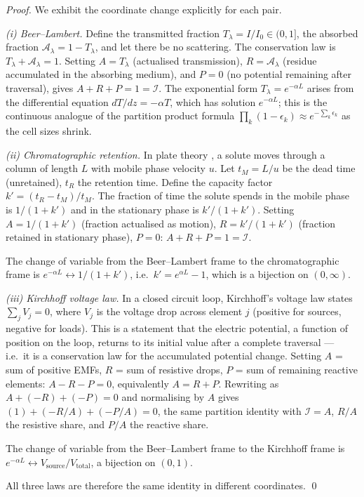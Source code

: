 \documentclass[11pt,twocolumn,a4paper]{article}
\theoremstyle{plain}
\theoremstyle{definition}
\theoremstyle{remark}
\begin{document}
\begin{proof}
We exhibit the coordinate change explicitly for each pair.

\medskip
\noindent\textit{(i) Beer--Lambert.} Define the transmitted fraction $T_\lambda=I/I_0\in(0,1]$, the absorbed fraction $\mathcal{A}_\lambda=1-T_\lambda$, and let there be no scattering. The conservation law is $T_\lambda+\mathcal{A}_\lambda=1$. Setting $A=T_\lambda$ (actualised transmission), $R=\mathcal{A}_\lambda$ (residue accumulated in the absorbing medium), and $P=0$ (no potential remaining after traversal), gives $A+R+P=1=\mathcal{I}$. The exponential form $T_\lambda=e^{-\alpha L}$ arises from the differential equation $dT/dz=-\alpha T$, which has solution $e^{-\alpha L}$; this is the continuous analogue of the partition product formula $\prod_k(1-\epsilon_k)\approx e^{-\sum_k\epsilon_k}$ as the cell sizes shrink.

\medskip
\noindent\textit{(ii) Chromatographic retention.} In plate theory \cite{Skoog2007}, a solute moves through a column of length $L$ with mobile phase velocity $u$. Let $t_M=L/u$ be the dead time (unretained), $t_R$ the retention time. Define the capacity factor $k'=(t_R-t_M)/t_M$. The fraction of time the solute spends in the mobile phase is $1/(1+k')$ and in the stationary phase is $k'/(1+k')$. Setting $A=1/(1+k')$ (fraction actualised as motion), $R=k'/(1+k')$ (fraction retained in stationary phase), $P=0$: $A+R+P=1=\mathcal{I}$.

The change of variable from the Beer--Lambert frame to the chromatographic frame is $e^{-\alpha L}\leftrightarrow 1/(1+k')$, i.e.\ $k'=e^{\alpha L}-1$, which is a bijection on $(0,\infty)$.

\medskip
\noindent\textit{(iii) Kirchhoff voltage law.} In a closed circuit loop, Kirchhoff's voltage law states $\sum_j V_j=0$, where $V_j$ is the voltage drop across element $j$ (positive for sources, negative for loads). This is a statement that the electric potential, a function of position on the loop, returns to its initial value after a complete traversal — i.e.\ it is a conservation law for the accumulated potential change. Setting $A$ = sum of positive EMFs, $R$ = sum of resistive drops, $P$ = sum of remaining reactive elements: $A-R-P=0$, equivalently $A=R+P$. Rewriting as $A+(-R)+(-P)=0$ and normalising by $A$ gives $(1)+(-R/A)+(-P/A)=0$, the same partition identity with $\mathcal{I}=A$, $R/A$ the resistive share, and $P/A$ the reactive share.

The change of variable from the Beer--Lambert frame to the Kirchhoff frame is $e^{-\alpha L}\leftrightarrow V_\text{source}/V_\text{total}$, a bijection on $(0,1)$.

All three laws are therefore the same identity in different coordinates. \qed
\end{proof}
\end{document}
